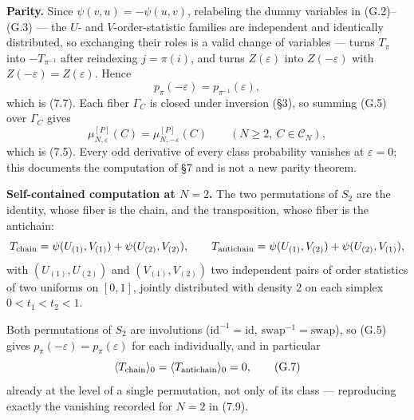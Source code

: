 \documentclass[11pt]{article}
\begin{document}
\textbf{Parity.} Since \(\psi(v,u)=-\psi(u,v)\), relabeling the dummy variables in (G.2)--(G.3) --- the \(U\)- and \(V\)-order-statistic families are independent and identically distributed, so exchanging their roles is a valid change of variables --- turns \(T_\pi\) into \(-T_{\pi^{-1}}\) after reindexing \(j=\pi(i)\), and turns \(Z(\varepsilon)\) into \(Z(-\varepsilon)\) with \(Z(-\varepsilon)=Z(\varepsilon)\). Hence \[ p_\pi(-\varepsilon)=p_{\pi^{-1}}(\varepsilon), \tag{G.5} \] which is (7.7). Each fiber \(\Gamma_C\) is closed under inversion (\S3), so summing (G.5) over \(\Gamma_C\) gives \[ \boxed{ \mu_{N,\varepsilon}^{[P]}(C)=\mu_{N,-\varepsilon}^{[P]}(C) } \qquad(N\ge2,\ C\in\mathcal C_N), \tag{G.6} \] which is (7.5). Every odd derivative of every class probability vanishes at \(\varepsilon=0\); this documents the computation of \S7 and is not a new parity theorem.

\textbf{Self-contained computation at \(N=2\).} The two permutations of \(S_2\) are the identity, whose fiber is the chain, and the transposition, whose fiber is the antichain: \[ T_{\rm chain}=\psi(U_{(1)},V_{(1)})+\psi(U_{(2)},V_{(2)}), \qquad T_{\rm antichain}=\psi(U_{(1)},V_{(2)})+\psi(U_{(2)},V_{(1)}), \] with \((U_{(1)},U_{(2)})\) and \((V_{(1)},V_{(2)})\) two independent pairs of order statistics of two uniforms on \([0,1]\), jointly distributed with density \(2\) on each simplex \(0<t_1<t_2<1\).

Both permutations of \(S_2\) are involutions (\(\mathrm{id}^{-1}=\mathrm{id}\), \(\mathrm{swap}^{-1}=\mathrm{swap}\)), so (G.5) gives \(p_\pi(-\varepsilon)=p_\pi(\varepsilon)\) for each individually, and in particular \[ \langle T_{\rm chain}\rangle_0=\langle T_{\rm antichain}\rangle_0=0, \tag{G.7} \] already at the level of a single permutation, not only of its class --- reproducing exactly the vanishing recorded for \(N=2\) in (7.9).
\end{document}
